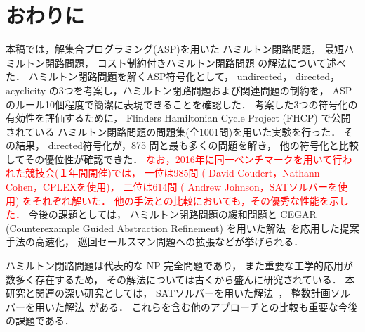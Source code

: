 ﻿%
\section{おわりに}\label{chap:conclusion}

本稿では，解集合プログラミング(ASP)を用いた
ハミルトン閉路問題，
最短ハミルトン閉路問題，
コスト制約付きハミルトン閉路問題
の解法について述べた．
%
ハミルトン閉路問題を解くASP符号化として，
\textsf{undirected}，
\textsf{directed}，
\textsf{acyclicity}
の3つを考案し，ハミルトン閉路問題および関連問題の制約を，
ASPのルール10個程度で簡潔に表現できることを確認した．
%
考案した3つの符号化の有効性を評価するために，
Flinders Hamiltonian Cycle Project (FHCP) で公開されている
ハミルトン閉路問題の問題集(全1001問)を用いた実験を行った．
その結果，
\textsf{directed}符号化が，875 問と最も多くの問題を解き，
他の符号化と比較してその優位性が確認できた．
\textcolor{red}{
  なお，2016年に同一ベンチマークを用いて行われた競技会(１年間開催)では，
  一位は985問
  ( David Coudert，Nathann Cohen，CPLEXを使用\cite{cohen17:1001graph})，
  二位は614問 ( Andrew Johnson，SATソルバーを使用\cite{andrew18:triple})
  をそれぞれ解いた．
  他の手法との比較においても，その優秀な性能を示した．
}
今後の課題としては，
ハミルトン閉路問題の緩和問題と
CEGAR (Counterexample Guided Abstraction Refinement)
を用いた解法~\cite{soh14:jelia2014,soh20:cegar}を応用した提案手法の高速化，
巡回セールスマン問題への拡張などが挙げられる．

ハミルトン閉路問題は代表的な NP 完全問題であり，
また重要な工学的応用が数多く存在するため，
その解法については古くから盛んに研究されている．
本研究と関連の深い研究としては，
SATソルバーを用いた解法~\cite{Prestwich03:DAM,VelevG09:relative,soh14:jelia2014}，
整数計画ソルバーを用いた解法~\cite{numata11:tsp}がある．
これらを含む他のアプローチとの比較も重要な今後の課題である．


